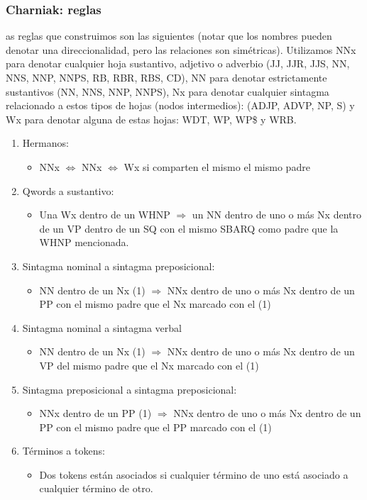 \begin{frame}
\frametitle{Charniak: reglas}
as reglas que construimos son las siguientes (notar que los nombres pueden denotar una direccionalidad, pero las relaciones son simétricas).
Utilizamos NNx para denotar cualquier hoja sustantivo, adjetivo o adverbio (JJ, JJR, JJS, NN, NNS, NNP, NNPS, RB, RBR, RBS, CD), NN para denotar estrictamente sustantivos (NN, NNS, NNP, NNPS), Nx para denotar cualquier sintagma relacionado a estos tipos de hojas (nodos intermedios): (ADJP, ADVP, NP, S) y Wx para denotar alguna de estas hojas: WDT, WP, WP\$ y WRB.

\begin{enumerate}
\item Hermanos:
  \begin{itemize}
    \item  NNx $\Leftrightarrow$ NNx $\Leftrightarrow$ Wx si comparten el mismo el mismo padre
  \end{itemize}
\item Qwords a sustantivo:
  \begin{itemize}
    \item Una Wx dentro de un WHNP $\Rightarrow$ un NN dentro de uno o más Nx dentro de un VP dentro de un SQ con el mismo SBARQ como padre que la WHNP mencionada.
  \end{itemize}
\item Sintagma nominal a sintagma preposicional:
  \begin{itemize}
    \item NN dentro de un Nx (1) $\Rightarrow$ NNx dentro de uno o más Nx dentro de un PP con el mismo padre que el Nx marcado con el (1)
  \end{itemize}
\item Sintagma nominal a sintagma verbal
    \begin{itemize}
      \item NN dentro de un Nx (1) $\Rightarrow$ NNx dentro de uno o más Nx dentro de un VP del mismo padre que el Nx marcado con el (1)
    \end{itemize}
\item Sintagma preposicional a sintagma preposicional:
  \begin{itemize}
    \item NNx dentro de un PP (1) $\Rightarrow$ NNx dentro de uno o más Nx dentro de un PP con el mismo padre que el PP marcado con el (1)
  \end{itemize}
  \item Términos a tokens:
  \begin{itemize}
    \item Dos tokens están asociados si cualquier término de uno está asociado a cualquier término de otro.
  \end{itemize}
\end{enumerate}



\end{frame}
